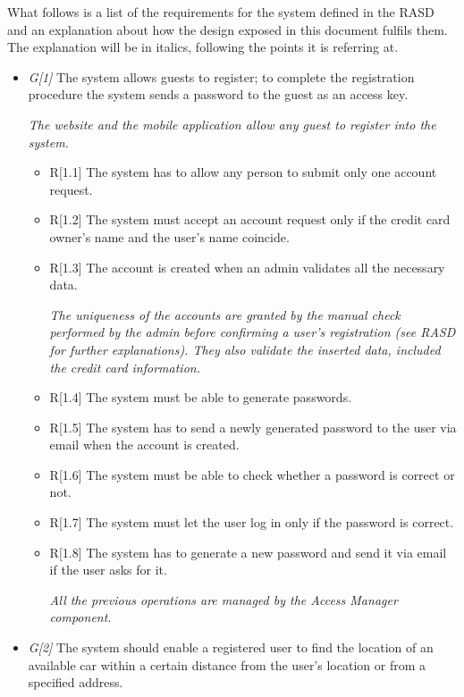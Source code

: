 What follows is a list of the requirements for the system defined in the RASD and an explanation about how the design exposed in this document fulfils them. The explanation will be in italics, following the points it is referring at.

\begin{itemize}
\item \textit{G[1]} The system allows guests to register; to complete the registration procedure the system sends a password to the guest as an access key.

	\textit{The website and the mobile application allow any guest to register into the system.}

	\begin{itemize}
		\item R[1.1] The system has to allow any person to submit only one account request.
		\item R[1.2] The system must accept an account request only if the credit card owner's name and the user's name coincide.
		\item R[1.3] The account is created when an admin validates all the necessary data.

			\textit{The uniqueness of the accounts are granted by the manual check performed by the admin before confirming a user's registration (see RASD for further explanations). They also validate the inserted data, included the credit card information.}

		\item R[1.4] The system must be able to generate passwords.
		\item R[1.5] The system has to send a newly generated password to the user via email when the account is created.
		\item R[1.6] The system must be able to check whether a password is correct or not.
		\item R[1.7] The system must let the user log in only if the password is correct. 
		\item R[1.8] The system has to generate a new password and send it via email if the user asks for it.

			\textit{All the previous operations are managed by the Access Manager component.}
	\end{itemize}

\item \textit{G[2]} The system should enable a registered user to find the location of an available car within a certain distance from the user's location or from a specified address.


\end{itemize}

